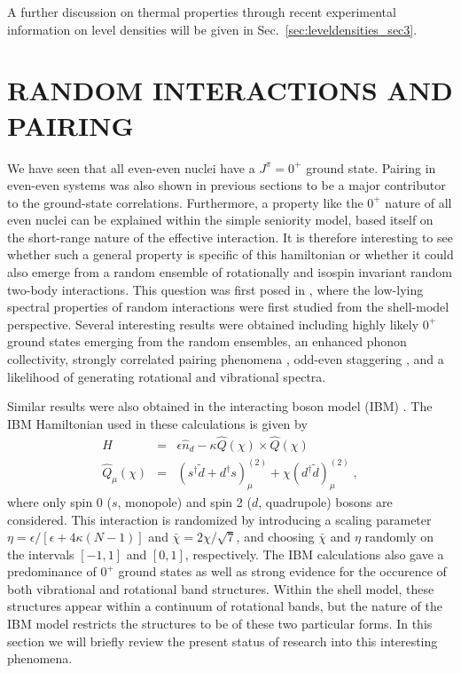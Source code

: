 \documentclass[rmp,aps,floatfix]{revtex4}
\begin{document}
A further discussion on thermal properties through recent experimental
information on level densities will be given in 
Sec.~\ref{sec:leveldensities_sec3}. 



\section{RANDOM INTERACTIONS AND PAIRING}

\label{sec:randoms}

We have seen that all even-even
nuclei have a $J^{\pi}=0^+$ ground state. Pairing in
even-even systems was also shown in previous sections 
to be a major contributor to the ground-state correlations. 
Furthermore, a property like the $0^+$ nature of all even nuclei
can be explained within the simple seniority model, based itself 
on the short-range nature of the effective interaction. It is therefore 
interesting to see whether such a general property is specific of this
hamiltonian or whether it could also 
emerge from 
a random ensemble of rotationally and isospin invariant random two-body
interactions. This question was first posed in 
\cite{jbd98}, where the low-lying spectral properties
of random interactions were first studied from the shell-model
perspective. Several interesting results were obtained including
highly likely $0^+$ ground states emerging from the random ensembles,
an enhanced phonon collectivity, strongly correlated pairing 
phenomena \cite{jbdt00}, odd-even staggering \cite{papen02},
and a likelihood of generating rotational and vibrational spectra. 

Similar results
were also obtained in the interacting
boson model (IBM) \cite{bf00}. 
The IBM Hamiltonian used in these calculations is given by 
\begin{eqnarray}
H &=& \epsilon\hat{n}_d - \kappa\hat{Q}(\chi)\times \hat{Q}(\chi) \; \\
\hat{Q}_\mu(\chi)&=&\left(s^\dagger\tilde{d}+d^\dagger s\right)_\mu^{(2)}
+\chi \left(d^\dagger \tilde{d}\right)^{(2)}_\mu \;, 
\end{eqnarray}
where only spin 0 ($s$, monopole) and spin 2 ($d$, quadrupole) 
bosons are considered. This interaction is randomized by introducing
a scaling parameter $\eta = \epsilon/\left[\epsilon + 4\kappa(N-1)\right]$
and $\bar{\chi}=2\chi/\sqrt{7}$, and choosing $\bar{\chi}$ and $\eta$ 
randomly on the intervals $[-1,1]$ and $[0,1]$, respectively. 
The IBM calculations also 
gave a predominance of $0^+$ ground states as well as 
strong evidence for the occurence of both vibrational and
rotational band structures. Within the shell model, these structures
appear within a continuum of rotational bands, but the nature of the
IBM model restricts the structures to be of these two particular
forms. In this section we will briefly review the present 
status of research into this interesting phenomena. 
\end{document}

